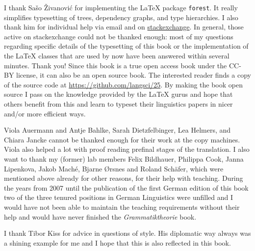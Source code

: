 I thank Sašo Živanović for implementing the \LaTeX{} package \texttt{forest}. It really simplifies
typesetting of trees, dependency graphs, and type hierarchies. I also thank him for individual help
via email and on \href{http://www.stackexchange.com}{stackexchange}. In general, those active on stackexchange could not be thanked
enough: most of my questions regarding specific details of the typesetting of this book or the
implementation of the \LaTeX{} classes that are used by \lsp now have been answered within several
minutes. Thank you! Since this book is a true open access book under the CC-BY license, it can also
be an open source book. The interested reader finds a copy of the source code at \url{https://github.com/langsci/25}. By making the book open source I pass on the knowledge provided by the \LaTeX{} gurus and
hope that others benefit from this and learn to typeset their linguistics papers in nicer and/or
more efficient ways.


Viola Auermann and Antje Bahlke, Sarah Dietzfelbinger, Lea Helmers, and Chiara Jancke cannot be thanked enough for their work at the copy machines. Viola
also helped a lot with proof reading prefinal stages of the translation.
I also want to thank my (former) lab members Felix Bildhauer, Philippa Cook, Janna Lipenkova, Jakob Maché,
Bjarne Ørsnes and Roland Schäfer, which were mentioned above already
for other reasons, for their help with teaching. During the years from 2007 until the publication of
the first German edition of this book two of the three tenured positions in German Linguistics were
unfilled and I would have not been able to maintain the teaching requirements without their help and
would have never finished the \emph{Grammatiktheorie} book.

I thank Tibor Kiss for advice in questions of style. His diplomatic way always was a shining
example for me and I hope that this is also reflected in this book.

